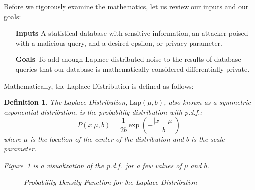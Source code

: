 \documentclass[conference,11pt]{IEEEtran}
\newtheorem{definition}{Definition}
\begin{document}
Before we rigorously examine the mathematics, let us review our inputs and our
goals:

\begin{itemize}[leftmargin=4em]
    \item [\textbf{Inputs}] A statistical database with sensitive information,
        an attacker poised with a malicious query, and a desired epsilon, or
        privacy parameter.

    \item [\textbf{Goals}] To add enough Laplace-distributed noise to the
        results of database queries that our database is mathematically
        considered differentially private.
\end{itemize}

{\vfill\eject}

Mathematically, the Laplace Distribution is defined as follows:
\begin{mdframed}
    \begin{definition}
        The Laplace Distribution, $\text{Lap}(\mu, b)$, also known as a
        symmetric exponential distribution, is the probability distribution with
        p.d.f.:
        \begin{equation}
            P(x|\mu, b) = \frac{1}{2b}\exp\left(-\frac{|x - \mu|}{b}\right)
        \end{equation}
        where $\mu$ is the location of the center of the distribution and $b$ is
        the scale parameter.

        Figure~\ref{fig:laplace-pdf} is a visualization of the p.d.f.\ for a few
        values of $\mu$ and $b$.\\

        \begin{figure}[H]
            \caption{Probability Density Function for the Laplace Distribution}
            \label{fig:laplace-pdf}
        \end{figure}
    \end{definition}
\end{mdframed}
\end{document}
